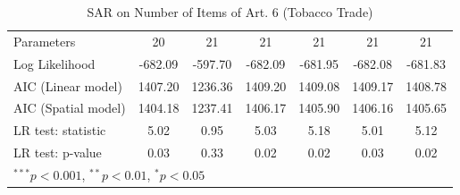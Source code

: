 \begin{table}[!h]
\begin{center}
\begin{tabular}{l c c c c c c }
Parameters              & 20           & 21            & 21           & 21           & 21           & 21           \\
Log Likelihood          & -682.09      & -597.70       & -682.09      & -681.95      & -682.08      & -681.83      \\
AIC (Linear model)      & 1407.20      & 1236.36       & 1409.20      & 1409.08      & 1409.17      & 1408.78      \\
AIC (Spatial model)     & 1404.18      & 1237.41       & 1406.17      & 1405.90      & 1406.16      & 1405.65      \\
LR test: statistic      & 5.02         & 0.95          & 5.03         & 5.18         & 5.01         & 5.12         \\
LR test: p-value        & 0.03         & 0.33          & 0.02         & 0.02         & 0.03         & 0.02         \\
\bottomrule
\multicolumn{7}{l}{\scriptsize{$^{***}p<0.001$, $^{**}p<0.01$, $^*p<0.05$}}
\end{tabular}
\caption{SAR on Number of Items of Art. 6 (Tobacco Trade)}
\label{table:coefficients}
\end{center}
\end{table}
